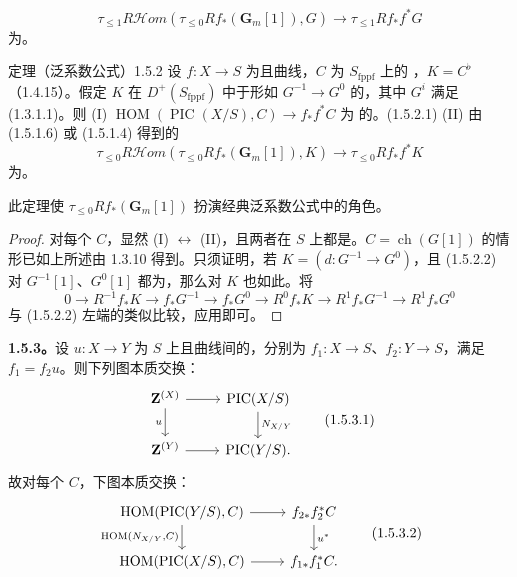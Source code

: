 \[\tau_{\le1}R\mathcal Hom(\tau_{\le0}Rf_*(\mathbf G_m[1]),G)\to\tau_{\le1}Rf_*f^*G\tag{1.5.1.7}\]
为。
\begin{SGAresult}{定理（泛系数公式）}{1.5.2}
设 $f:X\to S$ 为且曲线，$C$ 为 $S_{\mathrm{fppf}}$ 上的 ，$K=C^\flat$（1.4.15）。假定 $K$ 在 $D^+(S_{\mathrm{fppf}})$ 中于形如 $G^{-1}\to G^0$ 的，其中 $G^i$ 满足 (1.3.1.1)。则
(I)  $\operatorname{HOM}(\operatorname{PIC}(X/S),C)\to f_*f^*C$ 为 的。\hfill(1.5.2.1)
(II) 由 (1.5.1.6) 或 (1.5.1.4) 得到的
\[\tau_{\le0}R\mathcal Hom(\tau_{\le0}Rf_*(\mathbf G_m[1]),K)\to\tau_{\le0}Rf_*f^*K\tag{1.5.2.2}\]
为。
\end{SGAresult}
此定理使 $\tau_{\le0}Rf_*(\mathbf G_m[1])$ 扮演经典泛系数公式中的角色。
\begin{proof}
对每个 $C$，显然 (I) $\leftrightarrow$ (II)，且两者在 $S$ 上都是。$C=\operatorname{ch}(G[1])$ 的情形已如上所述由 1.3.10 得到。只须证明，若 $K=(d:G^{-1}\to G^0)$，且 (1.5.2.2) 对 $G^{-1}[1]$、$G^0[1]$ 都为，那么对 $K$ 也如此。将
\[0\to R^{-1}f_*K\to f_*G^{-1}\to f_*G^0\to R^0f_*K\to R^1f_*G^{-1}\to R^1f_*G^0\]
与 (1.5.2.2) 左端的类似比较，应用即可。
\end{proof}
\textbf{1.5.3。}设 $u:X\to Y$ 为 $S$ 上且曲线间的，分别为 $f_1:X\to S$、$f_2:Y\to S$，满足 $f_1=f_2u$。则下列图本质交换：
\[\begin{tikzcd}\mathbf Z^{(X)}\arrow[r]\arrow[d,"u"']&\operatorname{PIC}(X/S)\arrow[d,"N_{X/Y}"]\\\mathbf Z^{(Y)}\arrow[r]&\operatorname{PIC}(Y/S).\end{tikzcd}\tag{1.5.3.1}\]
故对每个  $C$，下图本质交换：
\[\begin{tikzcd}\operatorname{HOM}(\operatorname{PIC}(Y/S),C)\arrow[r]\arrow[d,"{\operatorname{HOM}(N_{X/Y},C)}"']&f_{2*}f_2^*C\arrow[d,"u^*"]\\\operatorname{HOM}(\operatorname{PIC}(X/S),C)\arrow[r]&f_{1*}f_1^*C.
\end{tikzcd}\tag{1.5.3.2}\]

